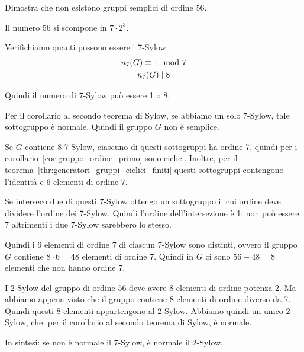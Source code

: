 \begin{esercizio}
    Dimostra che non esistono gruppi semplici di ordine 56.
\end{esercizio}
\begin{soluzione}
    Il numero 56 si scompone in $7 \cdot 2^3$.

    Verifichiamo quanti possono essere i 7-Sylow:
    \begin{gather*}
        n_7(G) \equiv 1 \mod 7 \\
        n_7(G) \mid 8
    \end{gather*}

    Quindi il numero di 7-Sylow può essere 1 o 8.

    Per il corollario al secondo teorema di Sylow, se abbiamo un solo 7-Sylow, tale sottogruppo è normale.
    Quindi il gruppo $G$ non è semplice.

    Se $G$ contiene 8 7-Sylow, ciascuno di questi sottogruppi ha ordine 7, quindi per i corollario~\ref{cor:gruppo_ordine_primo} sono ciclici.
    Inoltre, per il teorema~\ref{thr:generatori_gruppi_ciclici_finiti} questi sottogruppi contengono l'identità e
    6 elementi di ordine 7.

    Se interseco due di questi 7-Sylow ottengo un sottogruppo il cui ordine deve dividere l'ordine dei 7-Sylow.
    Quindi l'ordine dell'intersezione è 1: non può essere 7 altrimenti i due 7-Sylow sarebbero lo stesso.

    Quindi i 6 elementi di ordine 7 di ciascun 7-Sylow sono distinti, ovvero il gruppo $G$ contiene $8 \cdot 6 = 48$
    elementi di ordine 7.
    Quindi in $G$ ci sono $56-48 = 8$ elementi che non hanno ordine 7.

    I 2-Sylow del gruppo di ordine 56 deve avere 8 elementi di ordine potenza 2.
    Ma abbiamo appena visto che il gruppo contiene 8 elementi di ordine diverso da 7.
    Quindi questi 8 elementi appartengono al 2-Sylow.
    Abbiamo quindi un unico 2-Sylow, che, per il corollario al secondo teorema di Sylow, è normale.

    In sintesi: se non è normale il 7-Sylow, è normale il 2-Sylow.
\end{soluzione}


